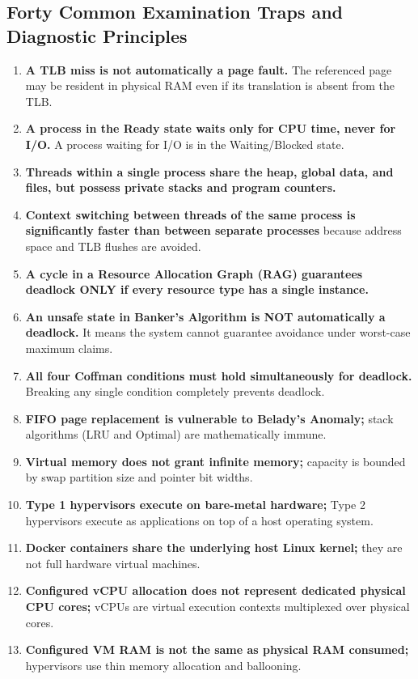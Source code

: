 \subsection{Forty Common Examination Traps and Diagnostic Principles}
\begin{enumerate}
    \item \textbf{A TLB miss is not automatically a page fault.} The referenced page may be resident in physical RAM even if its translation is absent from the TLB.
    \item \textbf{A process in the Ready state waits only for CPU time, never for I/O.} A process waiting for I/O is in the Waiting/Blocked state.
    \item \textbf{Threads within a single process share the heap, global data, and files, but possess private stacks and program counters.}
    \item \textbf{Context switching between threads of the same process is significantly faster than between separate processes} because address space and TLB flushes are avoided.
    \item \textbf{A cycle in a Resource Allocation Graph (RAG) guarantees deadlock ONLY if every resource type has a single instance.}
    \item \textbf{An unsafe state in Banker's Algorithm is NOT automatically a deadlock.} It means the system cannot guarantee avoidance under worst-case maximum claims.
    \item \textbf{All four Coffman conditions must hold simultaneously for deadlock.} Breaking any single condition completely prevents deadlock.
    \item \textbf{FIFO page replacement is vulnerable to Belady's Anomaly;} stack algorithms (LRU and Optimal) are mathematically immune.
    \item \textbf{Virtual memory does not grant infinite memory;} capacity is bounded by swap partition size and pointer bit widths.
    \item \textbf{Type 1 hypervisors execute on bare-metal hardware;} Type 2 hypervisors execute as applications on top of a host operating system.
    \item \textbf{Docker containers share the underlying host Linux kernel;} they are not full hardware virtual machines.
    \item \textbf{Configured vCPU allocation does not represent dedicated physical CPU cores;} vCPUs are virtual execution contexts multiplexed over physical cores.
    \item \textbf{Configured VM RAM is not the same as physical RAM consumed;} hypervisors use thin memory allocation and ballooning.

\end{enumerate}
